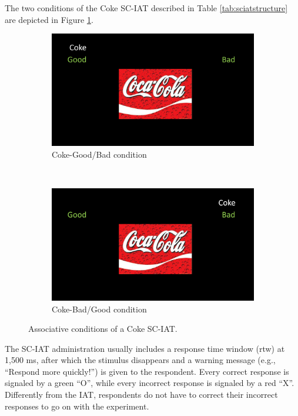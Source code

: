 \documentclass[12pt]{book}
\begin{document}
The two conditions of the Coke SC-IAT described in Table \ref{tab:sciatstructure} are depicted in Figure \ref{fig:SCIAT}. 

\begin{figure}[h!]
	\centering
	\begin{subfigure}[b]{0.4\linewidth}
		\includegraphics[width=\linewidth]{sccokegood.png}
		\caption{Coke-Good/Bad condition}
	\end{subfigure}
	~ %
	\begin{subfigure}[b]{0.4\linewidth}
		\includegraphics[width=\linewidth]{sccokebad.png}
		\caption{Coke-Bad/Good condition}
	\end{subfigure}
	\caption{\label{fig:SCIAT} Associative conditions of a Coke SC-IAT.}
\end{figure}

The SC-IAT administration usually includes a response time window (rtw) at 1,500 ms, after which the stimulus disappears and a warning message (e.g., ``Respond more quickly!'') is given to the respondent.
Every correct response is signaled by a green ``O'', while every incorrect response is signaled by a red ``X''. Differently from the IAT, respondents do not have to correct their incorrect responses to go on with the experiment. 
\end{document}
